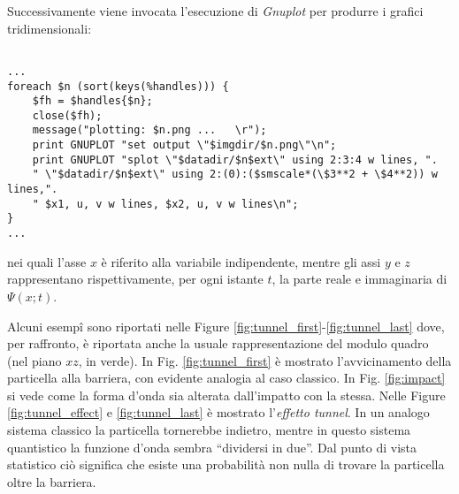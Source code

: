 Successivamente viene invocata l'esecuzione di 
\emph{Gnuplot}\cite{GNUPLOT} per produrre i grafici tridimensionali:
\begin{lstlisting}

...
foreach $n (sort(keys(%handles))) {
    $fh = $handles{$n};
    close($fh);
    message("plotting: $n.png ...   \r");
    print GNUPLOT "set output \"$imgdir/$n.png\"\n";
    print GNUPLOT "splot \"$datadir/$n$ext\" using 2:3:4 w lines, ".
    " \"$datadir/$n$ext\" using 2:(0):($smscale*(\$3**2 + \$4**2)) w lines,".
    " $x1, u, v w lines, $x2, u, v w lines\n";
}
...

\end{lstlisting}
nei quali l'asse $x$ è riferito alla variabile indipendente, mentre
gli assi $y$ e $z$ rappresentano rispettivamente, per ogni istante $t$,
la parte reale e immaginaria di $\Psi(x;t)$. 

Alcuni esemp\^i sono riportati nelle Figure 
\ref{fig:tunnel_first}-\ref{fig:tunnel_last} dove, per raffronto,
è riportata anche la usuale rappresentazione del modulo quadro (nel
piano $xz$, in verde). In Fig. \ref{fig:tunnel_first}
è mostrato l'avvicinamento della particella alla barriera, con evidente
analogia al caso classico. In Fig. \ref{fig:impact} si vede come la 
forma d'onda sia alterata dall'impatto con la stessa. 
Nelle Figure \ref{fig:tunnel_effect} e \ref{fig:tunnel_last} 
è mostrato l'\emph{effetto tunnel}. In un analogo sistema classico 
la particella tornerebbe indietro, mentre in questo sistema quantistico
la funzione d'onda sembra ``dividersi in due''. 
Dal punto di vista statistico ciò significa che esiste una probabilità 
non nulla di trovare la particella oltre la barriera.


